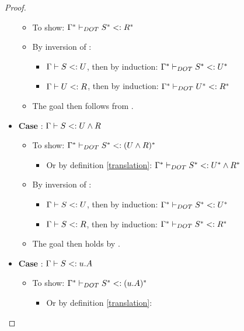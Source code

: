 \begin{proof}
\begin{itemize}
\begin{itemize}
            \item To show: $\Gamma^{*} \vdash_{DOT} S^{*} <: R^{*}$
            \item By inversion of :
            \begin{itemize}
                \item $\Gamma \vdash S <: U$, then by induction:
                    $\Gamma^{*} \vdash_{DOT} S^{*} <: U^{*}$
                \item $\Gamma \vdash U <: R$, then by induction:
                    $\Gamma^{*} \vdash_{DOT} U^{*} <: R^{*}$
            \end{itemize}
            \item The goal then follows from .
        \end{itemize}
        \item \textbf{Case} : $\Gamma \vdash S <: U \wedge R$
        \begin{itemize}
            \item To show:
                $\Gamma^{*} \vdash_{DOT} S^{*} <: (U \wedge R)^{*}$
            \begin{itemize}
                \item Or by definition \ref{translation}: $\Gamma^{*} \vdash_{DOT} S^{*} <: U^{*} \wedge R^{*}$
            \end{itemize}
            \item By inversion of :
            \begin{itemize}
                \item $\Gamma \vdash S <: U$, then by induction:
                    $\Gamma^{*} \vdash_{DOT} S^{*} <: U^{*}$
                \item $\Gamma \vdash S <: R$, then by induction:
                    $\Gamma^{*} \vdash_{DOT} S^{*} <: R^{*}$
            \end{itemize}
            \item The goal then holds by .
        \end{itemize}
        \item \textbf{Case} : $\Gamma \vdash S <: u.A$
        \begin{itemize}
            \item To show: $\Gamma^{*} \vdash_{DOT} S^{*} <: (u.A)^{*}$
            \begin{itemize}
                \item Or by definition \ref{translation}:

\end{itemize}
\end{itemize}
\end{itemize}
\end{proof}
